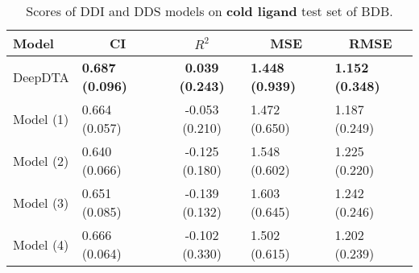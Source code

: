 \begin{table}[H]
\centering
\caption{Scores of DDI and DDS models on \textbf{cold ligand} test set of BDB.}
\label{tab:ddi_ci_r2}
\begin{tabular}{|l|l|c|l|l|} 
\hline
Model & \multicolumn{1}{c|}{CI} & $R^2$ & \multicolumn{1}{c|}{MSE} & \multicolumn{1}{c|}{RMSE} \\ 
\hline
DeepDTA & \textbf{0.687 (0.096)} & \textbf{0.039 (0.243)} & \textbf{1.448 (0.939)} & \textbf{1.152 (0.348)} \\ 
\hline
Model (1) & 0.664 (0.057) & -0.053 (0.210) & 1.472 (0.650) & 1.187 (0.249) \\ 
\hline
Model (2) & 0.640 (0.066) & -0.125 (0.180) & 1.548 (0.602) & 1.225 (0.220) \\ 
\hline
Model (3) & 0.651 (0.085) & -0.139 (0.132) & 1.603 (0.645) & 1.242 (0.246) \\ 
\hline
Model (4) & 0.666 (0.064) & -0.102 (0.330) & 1.502 (0.615) & 1.202 (0.239) \\
\hline
\end{tabular}
\label{tab:ddi_vs_dds_cold_ligand}
\end{table}